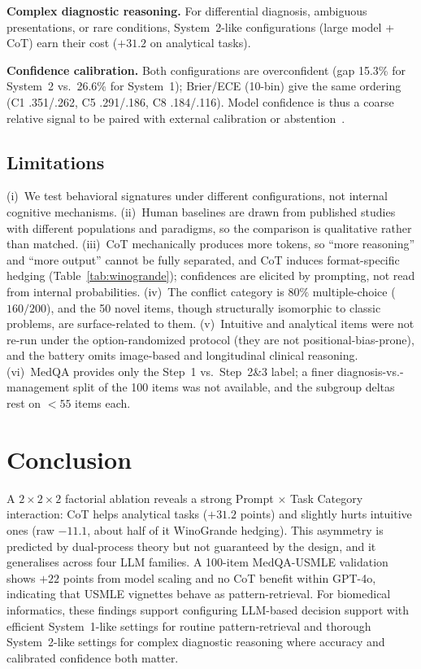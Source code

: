 \documentclass[conference]{IEEEtran}
\begin{document}
\textbf{Complex diagnostic reasoning.} For differential diagnosis, ambiguous presentations, or rare conditions, System~2-like configurations (large model + CoT) earn their cost ($+31.2$ on analytical tasks).

\textbf{Confidence calibration.} Both configurations are overconfident (gap 15.3\% for System~2 vs.\ 26.6\% for System~1); Brier/ECE (10-bin) give the same ordering (C1 .351/.262, C5 .291/.186, C8 .184/.116). Model confidence is thus a coarse relative signal to be paired with external calibration or abstention~\cite{Saposnik2016}.

\subsection{Limitations}

(i)~We test behavioral signatures under different configurations, not internal cognitive mechanisms. (ii)~Human baselines are drawn from published studies with different populations and paradigms, so the comparison is qualitative rather than matched. (iii)~CoT mechanically produces more tokens, so ``more reasoning'' and ``more output'' cannot be fully separated, and CoT induces format-specific hedging (Table~\ref{tab:winogrande}); confidences are elicited by prompting, not read from internal probabilities. (iv)~The conflict category is $80\%$ multiple-choice ($160/200$), and the 50 novel items, though structurally isomorphic to classic problems, are surface-related to them. (v)~Intuitive and analytical items were not re-run under the option-randomized protocol (they are not positional-bias-prone), and the battery omits image-based and longitudinal clinical reasoning. (vi)~MedQA provides only the Step~1 vs.\ Step~2\&3 label; a finer diagnosis-vs.-management split of the 100 items was not available, and the subgroup deltas rest on ${<}55$ items each.

\section{Conclusion}
\label{sec:conclusion}

A $2 \times 2 \times 2$ factorial ablation reveals a strong Prompt $\times$ Task Category interaction: CoT helps analytical tasks ($+31.2$ points) and slightly hurts intuitive ones (raw $-11.1$, about half of it WinoGrande hedging). This asymmetry is predicted by dual-process theory but not guaranteed by the design, and it generalises across four LLM families. A 100-item MedQA-USMLE validation shows $+22$ points from model scaling and no CoT benefit within GPT-4o, indicating that USMLE vignettes behave as pattern-retrieval. For biomedical informatics, these findings support configuring LLM-based decision support with efficient System~1-like settings for routine pattern-retrieval and thorough System~2-like settings for complex diagnostic reasoning where accuracy and calibrated confidence both matter.
\end{document}
